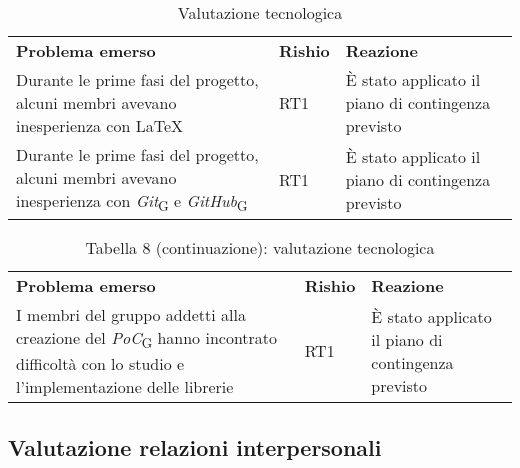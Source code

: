     \begin{table}[h]
        \begin{adjustbox}{width=\textwidth}
            \centering
            \renewcommand{\arraystretch}{1.1}
            \begin{tabular}{>{\centering\arraybackslash} m{5cm} >{\centering\arraybackslash} m{1.5cm} >{\centering\arraybackslash} m{4cm}}
                \rowcolor[HTML]{bfbfbf} 
                \textbf{Problema emerso} & \textbf{Rishio} & \textbf{Reazione} \\
                Durante le prime fasi del progetto, alcuni membri avevano inesperienza con \LaTeX & RT1 & È stato applicato il piano di contingenza previsto \\
                Durante le prime fasi del progetto, alcuni membri avevano inesperienza con \textit{Git}\textsubscript{G} e  \textit{GitHub}\textsubscript{G} & RT1 & È stato applicato il piano di contingenza previsto \\
            \end{tabular}
        \end{adjustbox}
        \caption{Valutazione tecnologica}
    \end{table}
    \clearpage

    
    \begin{table}[h]
        \begin{adjustbox}{width=\textwidth}
            \centering
            \renewcommand{\arraystretch}{1.1}
            \begin{tabular}{>{\centering\arraybackslash} m{5cm} >{\centering\arraybackslash} m{1.5cm} >{\centering\arraybackslash} m{4cm}}
                \rowcolor[HTML]{bfbfbf} 
                \textbf{Problema emerso} & \textbf{Rishio} & \textbf{Reazione} \\
                I membri del gruppo addetti alla creazione del \textit{PoC}\textsubscript{G} hanno incontrato difficoltà con lo studio e l'implementazione delle librerie & RT1 & È stato applicato il piano di contingenza previsto \\
            \end{tabular}
        \end{adjustbox}
        \caption*{Tabella 8 (continuazione): valutazione tecnologica}
    \end{table}


\vfil    
\subsection{Valutazione relazioni interpersonali}

